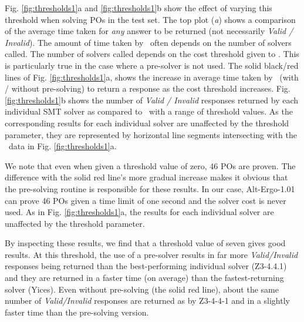 Fig. \ref{fig:thresholds1}a and \ref{fig:thresholds1}b show the effect of varying this threshold when solving POs in the test set.
The top plot (\textit{a}) shows a comparison of the average time taken for \textit{any} answer to be returned (not necessarily \textit{Valid / Invalid}).
The amount of time taken by \where~often depends on the number of solvers called.
The number of solvers called depends on the cost threshold given to \where.
This is particularly true in the case where a pre-solver is not used. 
The solid black/red lines of Fig. \ref{fig:thresholds1}a, shows the increase in average time taken by \where~(with / without pre-solving) to return a response as the cost threshold increases.
Fig. \ref{fig:thresholds1}b shows the number of \textit{Valid / Invalid} responses returned by each individual SMT solver as compared to \where~with a range of threshold values.
As the corresponding results for each individual solver are unaffected by the threshold parameter, they are represented by horizontal line segments intersecting with the \where~data in Fig. \ref{fig:thresholds1}a.

We note that even when given a threshold value of zero, 46 POs are proven.
The difference with the solid red line's more gradual increase makes it obvious that the pre-solving routine is responsible for these results.
In our case, Alt-Ergo-1.01 can prove 46 POs given a time limit of one second and the solver cost is never used.
As in Fig. \ref{fig:thresholds1}a, the results for each individual solver are unaffected by the threshold parameter.

By inspecting these results, we find that a threshold value of seven gives good results.
At this threshold, the use of a pre-solver results in far more \textit{Valid/Invalid} responses being returned than the best-performing individual solver (Z3-4.4.1) and they are returned in a faster time (on average) than the fastest-returning solver (Yices).
Even without pre-solving (the solid red line), about the same number of \textit{Valid/Invalid} responses are returned as by Z3-4-4-1 and in a slightly faster time than the pre-solving version. 

